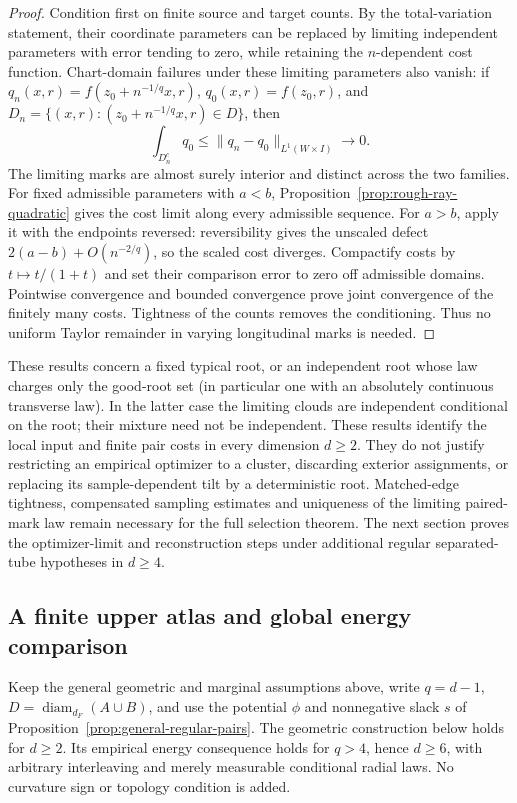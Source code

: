\documentclass[11pt,reqno]{amsart}
\theoremstyle{definition}
\theoremstyle{remark}
\numberwithin{equation}{section}
\begin{document}
\begin{proof}
Condition first on finite source and target counts. By the
total-variation statement, their coordinate parameters can be
replaced by limiting independent parameters with error tending
to zero, while retaining the \(n\)-dependent cost function.
Chart-domain failures under these limiting parameters also vanish:
if \(q_n(x,r)=f(z_0+n^{-1/q}x,r)\), \(q_0(x,r)=f(z_0,r)\), and
\(D_n=\{(x,r):(z_0+n^{-1/q}x,r)\in D\}\), then
\[
\int_{D_n^c}q_0\le\|q_n-q_0\|_{L^1(W\times I)}\longrightarrow0.
\]
The limiting marks are almost surely interior and distinct across
the two families. For fixed admissible parameters with \(a<b\),
Proposition~\ref{prop:rough-ray-quadratic} gives the cost limit
along every admissible sequence. For \(a>b\), apply it with the
endpoints reversed: reversibility gives the unscaled defect
\(2(a-b)+O(n^{-2/q})\), so the scaled cost diverges.
Compactify costs by \(t\mapsto t/(1+t)\) and set their comparison
error to zero off admissible domains. Pointwise convergence and
bounded convergence prove joint convergence of the finitely many
costs. Tightness of the counts removes the conditioning. Thus no
uniform Taylor remainder in varying longitudinal marks is needed.
\end{proof}

These results concern a fixed typical root, or an independent root
whose law charges only the good-root set (in particular one with
an absolutely continuous transverse law). In the latter case the
limiting clouds are independent conditional on the root; their
mixture need not be independent. These results identify the local
input and finite pair costs in every dimension \(d\ge2\).
They do not justify restricting an empirical optimizer to a cluster,
discarding exterior assignments, or replacing its sample-dependent
tilt by a deterministic root. Matched-edge tightness, compensated
sampling estimates and uniqueness of the limiting paired-mark law
remain necessary for the full selection theorem. The next section
proves the optimizer-limit and reconstruction steps under additional
regular separated-tube hypotheses in \(d\ge4\).

\subsection{A finite upper atlas and global energy comparison}
\label{subsec:general-upper-atlas}

Keep the general geometric and marginal assumptions above, write
\(q=d-1\), \(D=\operatorname{diam}_{d_F}(A\cup B)\), and use the
potential \(\phi\) and nonnegative slack \(s\) of
Proposition~\ref{prop:general-regular-pairs}. The geometric construction
below holds for \(d\ge2\). Its empirical energy consequence holds for
\(q>4\), hence \(d\ge6\), with arbitrary interleaving and merely
measurable conditional radial laws. No curvature sign or topology
condition is added.
\end{document}
